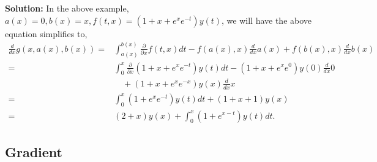 \documentclass[14pt]{article}
\theoremstyle{definition}
\newenvironment{solution}
{\color{C2}\begin{framed}\begingroup\textbf{Solution:} }
  {\endgroup\end{framed}}
\theoremstyle{remark}
\begin{document}
\begin{solution}
    In the above example, $a(x)=0, b(x)=x, f(t, x)=\left(1+x+e^x e^{-t}\right) y(t)$, we will have the above equation simplifies to,
    \begin{align*}
        \frac{d}{d x} g\left(x,a(x),b(x) \right) = & \int_{a(x)}^{b(x)}{\frac{\partial}{\partial x} f(t,x) dt }  - f\left(a(x),x\right) \frac{d}{d x} a(x) +  f\left(b(x),x\right) \frac{d}{d x} b(x) \\
        =                                          & \int_{0}^{x}{\frac{\partial}{\partial x} \left( 1+x+ e^{x}  e^{-t} \right) y(t)   dt }  - \left(1+x+ e^{x}  e^{0} \right) y(0)   \frac{d}{d x} 0 \\
                                                   & \quad +  \left(1+x+ e^{x}  e^{-x}\right) y(x)   \frac{d}{d x} x                                                                                  \\
        =                                          & \int_{0}^{x}{ \left( 1+ e^{x}  e^{-t} \right) y(t)   dt }+  \left(1+x +1\right) y(x)                                                             \\
        =                                          & \left(2+x\right) y(x) +   \int_{0}^{x}{ \left( 1+ e^{x-t}  \right) y(t)   dt }.
    \end{align*}
\end{solution}

\subsection{Gradient}
\end{document}
